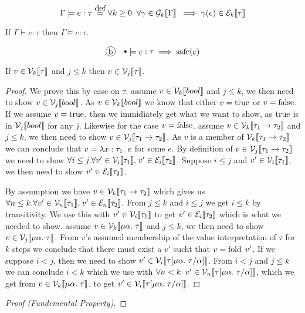 \[
  \Gamma \models e : \tau \eqdef \forall k \geq 0. \; \forall \gamma \in \gpres{\Gamma} \; \implies \gamma(e) \in \epres{\tau}
\]

\begin{stlcmufundprop}
  If $\Gamma \vdash e : \tau$ then $\Gamma \models e : \tau$.
\end{stlcmufundprop}

\[
\circled{b} \quad \mtenv \models e : \tau \implies \safe(e)
\]

\begin{monotonicity}
  If $v\in \vpres{\tau}$ and $j \leq k$  then $v \in \vpres[j]{\tau}$.
\end{monotonicity}
\begin{proof}
We prove this by case on $\tau$.
assume $v \in \vpres{bool}$ and $j \leq k$, we then need to show $v \in \vpres[j]{bool}$. As $v \in \vpres{bool}$ we know that either $v= \true$ or $v=\false$. If we assume $v=\true$, then we immidiately get what we want to show, as $\true$ is in $\vpres[j]{bool}$ for any $j$. Likewise for the case $v=\false$.
assume $v \in \vpres{\tarrow{\tau_1}{\tau_2}}$ and $j \leq k$, we then need to show $v \in \vpres[j]{\tarrow{\tau_1}{\tau_2}}$. As $v$ is a member of $\vpres{\tarrow{\tau_1}{\tau_2}}$ we can conclude that $v = \tlabs{x}{\tau_1}{e}$ for some $e$. By definition of $v \in \vpres[j]{\tarrow{\tau_1}{\tau_2}}$ we need to show $\forall i \leq j. \forall v' \in \vpres[i]{\tau_1}.\; v' \in \epres[i]{\tau_2}$. Suppose $i \leq j$ and $v' \in \vpres[i]{\tau_1}$, we then need to show $v' \in \epres[i]{\tau_2}$.

By assumption we have $v \in \vpres{\tarrow{\tau_1}{\tau_2}}$ which gives us $\forall n \leq k. \forall v' \in \vpres[n]{\tau_1}.\; v' \in \epres[n]{\tau_2}$. From $j \leq k$ and $i \leq j$ we get $i \leq k$ by transitivity. We use this with $v' \in \vpres[i]{\tau_1}$ to get $v' \in \epres[i]{\tau_2}$ which is what we needed to show.
assume $v \in \vpres{\mu\alpha. \; \tau}$ and $j \leq k$, we then need to show $v \in \vpres[j]{\mu\alpha. \; \tau}$. From $v$'s assumed membership of the value interpretation of $\tau$ for $k$ steps we conclude that there must exist a $v'$ sucht that $v = \fold \; v'$. If we suppose $i<j$, then we need to show $v' \in \vpres[i]{\subst{\tau}{\mu\alpha.\; \tau}{\alpha}}$. From $i<j$ and $j \leq k$ we can conclude $i < k$ which we use with $\forall n < k.\; v' \in \vpres[n]{\subst{\tau}{\mu\alpha.\; \tau}{\alpha}}$, which we get from $v \in \vpres{\mu\alpha. \; \tau}$, to get $v' \in \vpres[i]{\subst{\tau}{\mu\alpha.\; \tau}{\alpha}}$.
\end{proof}
\begin{proof}[Proof (Fundemental Property)]
\end{proof}

